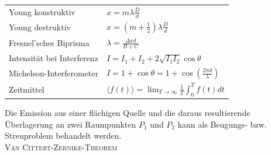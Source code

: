 \documentclass[12pt,a4paper]{article}
\renewcommand{\=}[1]{\stackrel{#1}{=}}
\theoremstyle{definition}
\theoremstyle{remark}
\begin{document}
\begin{center}
\begin{minipage}[t]{.6\linewidth}
\vspace{0pt}
\noindent\begin{tabular}{ll}
Young konstruktiv & $x = m \lambda \frac{D}{d}$\\
Young destruktiv & $x = (m+ \frac{1}{2}) \lambda \frac{D}{d}$\\
Fresnel'sches Biprisma & $\lambda = \frac{\Delta x d}{B + C}$\\
Intensität bei Interferenz & $I = I_1 + I_2 + 2\sqrt{I_1 I_2} \cos \theta$\\
Michelson-Interferometer &  $I = 1+\cos \theta = 1+\cos(\frac{2\pi d}{\lambda})$\\
Zeitmittel & $\langle f(t) \rangle = \lim_{T \rightarrow \infty} \frac{1}{T} \int_0^T f(t) dt$\\
\end{tabular}
\begin{framed}
Die Emission aus einer flächigen Quelle und die daraus resultierende Überlagerung an zwei Raumpunkten $P_1$ und $P_2$ kann als Beugungs- bzw. Streuproblem behandelt werden.\\
\centering\textsc{Van Cittert-Zernike-Theorem}
\end{framed}


\end{minipage}
\end{center}
\end{document}
